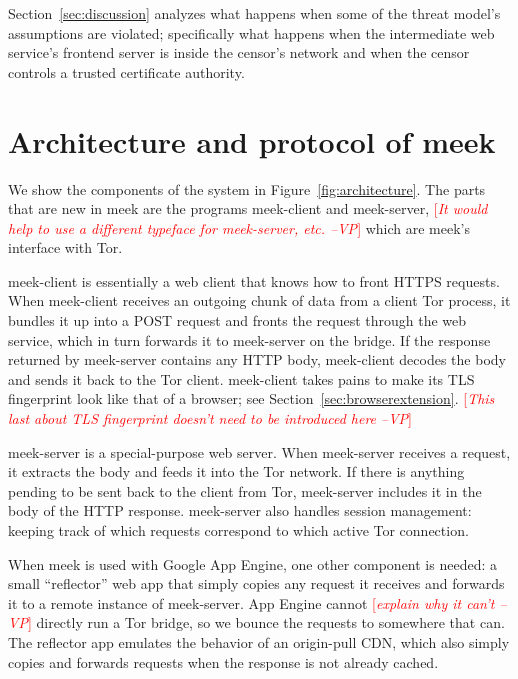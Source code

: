 \documentclass{sig-alternate}
\newcommand{\meekclient}{\mbox{meek-client}\xspace}
\newcommand{\meekserver}{\mbox{meek-server}\xspace}
\newcommand{\meek}{meek\xspace}
\newcommand{\note}[1]{{\textcolor{red}{[\textit{#1}]}}}
\newcommand{\vp}[1]{\note{#1 --VP}}
\begin{document}
Section~\ref{sec:discussion} analyzes what happens when some
of the threat model's assumptions are violated;
specifically what happens
when the intermediate web service's frontend server is inside the censor's network
and when the censor controls a trusted certificate authority.

\section{Architecture and protocol of meek}
\label{sec:architecture}

We show the components of the system in Figure~\ref{fig:architecture}.
The parts that are new in \meek
are the programs \meekclient and \meekserver,
\vp{It would help to use a different typeface for \meekserver, etc.}
which are \meek's interface with Tor.

\meekclient is essentially a web client that knows how to front HTTPS requests.
When \meekclient receives an outgoing chunk of data from a client Tor process, it bundles it up into a POST request
and fronts the request through the web service,
which in turn forwards it to \meekserver on the bridge.
If the response returned by \meekserver contains any HTTP body,
\meekclient decodes the body and sends it back to the Tor client.
\meekclient takes pains to make its TLS fingerprint
look like that of a browser; see Section~\ref{sec:browserextension}.
\vp{This last about TLS fingerprint doesn't need to be introduced here}

\meekserver is a special-purpose web server.
When \meekserver receives a request, it extracts the body and feeds it into
the Tor network.
If there is anything pending to be sent back to the client from Tor,
\meekserver includes it in the body of the HTTP response.
\meekserver also handles session management:
keeping track of which requests correspond to which active Tor connection.

When \meek is used with Google App Engine, one other component is needed:
a small ``reflector'' web app that simply copies any request
it receives and forwards it to a remote instance of \meekserver.
App Engine cannot
\vp{explain why it can't}
directly run a Tor bridge,
so we bounce the requests to somewhere that can.
The reflector app emulates the behavior of an origin-pull CDN,
which also simply copies and forwards requests
when the response is not already cached.
\end{document}
